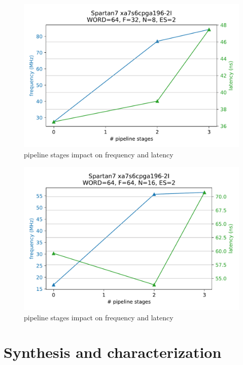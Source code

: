 \begin{figure}
        \centering
        \includegraphics[width=1\textwidth]{figures/Spartan7_xa7s6cpga196-2I_64_32_8_2_freq_lat.pdf}
        \caption{ pipeline stages impact on frequency and latency}
        \label{fig:spartan7_stages_vs_freqlatency_64_32_8_2}
\end{figure}
\begin{figure}
    \centering
    \includegraphics[width=1\textwidth]{figures/Spartan7_xa7s6cpga196-2I_64_64_16_2_freq_lat.pdf}
    \caption{ pipeline stages impact on frequency and latency}
    \label{fig:spartan7_stages_vs_freqlatency_64_64_16_2}
\end{figure}




\section{Synthesis and characterization}

